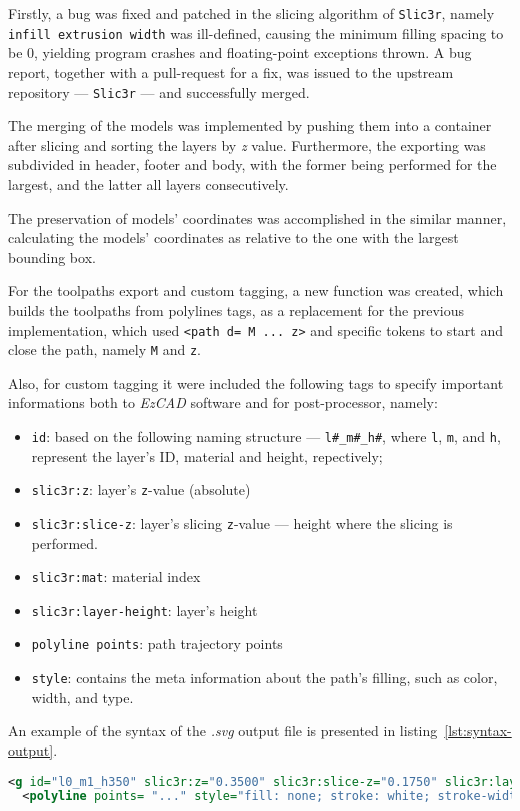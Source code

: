 Firstly, a bug was fixed and patched in the slicing algorithm of
\texttt{Slic3r}, namely \texttt{infill extrusion width}
was ill-defined, causing the minimum filling spacing to be 0, yielding
program crashes and floating-point exceptions thrown.
A bug report, together with a pull-request for a fix, was issued to the upstream repository --- \texttt{Slic3r} --- and successfully merged. 

The merging of the models was implemented by pushing them into a container after
slicing and sorting the layers by \emph{z} value. Furthermore, the exporting was subdivided in header, footer and body,
with the former being performed for the largest, and the latter all layers
consecutively.

The preservation of models' coordinates was accomplished in the similar manner,
calculating the models' coordinates as relative to the one with the largest
bounding box.

For the toolpaths export and custom tagging, a new function was created, which builds the toolpaths from polylines
tags, as a replacement for the previous implementation, which used \lstinline{<path d= M ... z>} and specific tokens to start and close the path,
namely \texttt{M} and \texttt{z}\cite{svgpath2018}.

Also, for custom tagging it were included the following tags to specify
important informations both to \emph{EzCAD} software and for post-processor,
namely:
\begin{itemize}
\item \lstinline{id}: based on the following naming structure --- \lstinline{l#_m#_h#},
  where \lstinline{l}, \lstinline{m}, and \lstinline{h}, represent the layer's ID, material
  and height, repectively;
\item \lstinline{slic3r:z}: layer's \texttt{z}-value (absolute)
\item \lstinline{slic3r:slice-z}: layer's slicing \texttt{z}-value --- height where
  the slicing is performed.
\item \lstinline{slic3r:mat}: material index
\item \lstinline{slic3r:layer-height}: layer's height
\item \lstinline{polyline points}: path trajectory points
\item \lstinline{style}: contains the meta information about the path's filling,
  such as color, width, and type.
\end{itemize}

An example of the syntax of the \emph{.svg} output file is presented in
listing~\ref{lst:syntax-output}.
%
\begin{lstlisting}[language=xml, basicstyle=\tiny, caption=Custom syntax example, label=lst:syntax-output]
  <g id="l0_m1_h350" slic3r:z="0.3500" slic3r:slice-z="0.1750" slic3r:layer-height="0.3500" slic3r:mat="1">
  <polyline points= "..." style="fill: none; stroke: white; stroke-width: 0.1; fill-type: evenodd" slic3r:type="internal-infill" />
\end{lstlisting}

